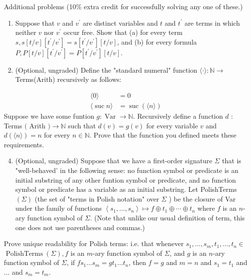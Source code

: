 \documentclass[10pt]{article}
\begin{document}
Additional problems (10\% extra credit for successfully solving any one of these.)

\begin{enumerate}
  \item Suppose that $v$ and $v^{\prime}$ are distinct variables and $t$ and $t^{\prime}$ are terms in which neither $v$ nor $v^{\prime}$ occur free. Show that (a) for every term $s, s[t / v]\left[t^{\prime} / v^{\prime}\right]=s\left[t^{\prime} / v^{\prime}\right][t / v]$, and (b) for every formula $P, P[t / v]\left[t^{\prime} / v^{\prime}\right]=P\left[t^{\prime} / v^{\prime}\right][t / v]$.

  \item (Optional, ungraded) Define the "standard numeral" function $\langle\cdot\rangle: \mathbb{N} \rightarrow$ Terms(Arith) recursively as follows:

\end{enumerate}
$$
\begin{aligned}
\langle 0\rangle &=0 \\
\langle\operatorname{suc} n\rangle &=\operatorname{suc}(\langle n\rangle)
\end{aligned}
$$
Suppose we have some funtion $g: \operatorname{Var} \rightarrow \mathbb{N}$. Recursively define a function $d$ : Terms $($ Arith $) \rightarrow \mathbb{N}$ such that $d(v)=g(v)$ for every variable $v$ and $d(\langle n\rangle)=n$ for every $n \in \mathbb{N}$. Prove that the function you defined meets these requirements.

\begin{enumerate}
  \setcounter{enumi}{3}
  \item (Optional, ungraded) Suppose that we have a first-order signature $\Sigma$ that is "well-behaved' in the following sense: no function symbol or predicate is an initial substring of any other funtion symbol or predicate, and no function symbol or predicate has a variable as an initial substring. Let PolishTerms $(\Sigma)$ (the set of "terms in Polish notation" over $\Sigma$ ) be the closure of Var under the family of functions $\left\langle s_{1}, \ldots, s_{n}\right\rangle \mapsto f \oplus t_{1} \oplus \cdots \oplus t_{n}$ where $f$ is an $n$-ary function symbol of $\Sigma$. (Note that unlike our usual definition of term, this one does not use parentheses and commas.)
\end{enumerate}
Prove unique readability for Polish terms: i.e. that whenever $s_{1}, \ldots, s_{m}, t_{1}, \ldots, t_{n} \in$ $\operatorname{PolishTerms}(\Sigma), f$ is an $m$-ary function symbol of $\Sigma$, and $g$ is an $n$-ary function symbol of $\Sigma$, if $f s_{1} \ldots s_{m}=g t_{1} \ldots t_{n}$, then $f=g$ and $m=n$ and $s_{1}=t_{1}$ and $\ldots$ and $s_{m}=t_{m}$.
\end{document}
